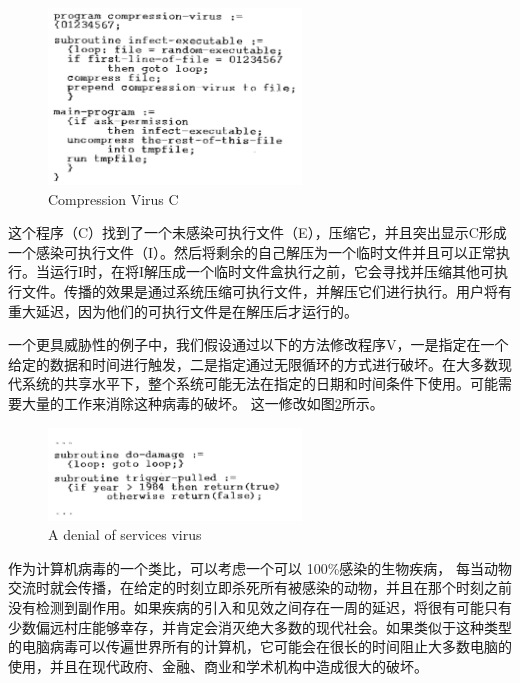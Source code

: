 \begin{figure}[h!]
    \centering
    \includegraphics[width=0.60\textwidth]{figure/fig2.png}
    \caption{Compression Virus C} 
    \label{fig2}
\end{figure} 

这个程序（C）找到了一个未感染可执行文件（E），压缩它，并且突出显示C形成一个感染可执行文件（I）。然后将剩余的自己解压为一个临时文件并且可以正常执行。当运行I时，在将I解压成一个临时文件盒执行之前，它会寻找并压缩其他可执行文件。传播的效果是通过系统压缩可执行文件，并解压它们进行执行。用户将有重大延迟，因为他们的可执行文件是在解压后才运行的。


一个更具威胁性的例子中，我们假设通过以下的方法修改程序V，一是指定在一个给定的数据和时间进行触发，二是指定通过无限循环的方式进行破坏。在大多数现代系统的共享水平下，整个系统可能无法在指定的日期和时间条件下使用。可能需要大量的工作来消除这种病毒的破坏。
这一修改如图\ref{fig3}所示。

\begin{figure}[h!]
    \centering
    \includegraphics[width=0.60\textwidth]{figure/fig3.png}
    \caption{A denial of services virus} 
    \label{fig3}
\end{figure} 

作为计算机病毒的一个类比，可以考虑一个可以
100\%感染的生物疾病，
每当动物交流时就会传播，在给定的时刻立即杀死所有被感染的动物，并且在那个时刻之前没有检测到副作用。如果疾病的引入和见效之间存在一周的延迟，将很有可能只有少数偏远村庄能够幸存，并肯定会消灭绝大多数的现代社会。如果类似于这种类型的电脑病毒可以传遍世界所有的计算机，它可能会在很长的时间阻止大多数电脑的使用，并且在现代政府、金融、商业和学术机构中造成很大的破坏。




